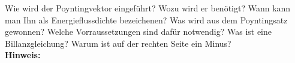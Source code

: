 \begin{question}[section=2,subsection=23,name={Poynting Vektor},difficulty=3,type=mdl,tags={}]
	Wie wird der Poyntingvektor eingeführt? Wozu wird er benötigt? Wann kann man Ihn als Energieflussdichte bezeichenen? Was wird aus dem Poyntingsatz gewonnen? Welche Vorraussetzungen sind dafür notwendig? Was ist eine Billanzgleichung? Warum ist auf der rechten Seite ein Minus?
	\\ \textbf{Hinweis:}\\
	
\end{question}
\begin{solution}
	
\end{solution}